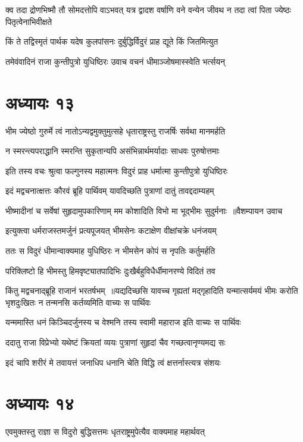 \threelineshloka
{क्व तदा द्रोणभिष्मौ तौ सोमदत्तोपि वाऽभवत्}
{यत्र द्वादश वर्षाणि वने वन्येन जीवथ}
{न तदा त्वां पिता ज्येष्ठः पितृत्वेनाभिवीक्षते}


\twolineshloka
{किं ते तद्विस्मृतं पार्थक यदेष कुलपांसनः}
{दुर्बुद्धिर्विदुरं प्राह द्यूते किं जितमित्युत}


\twolineshloka
{तमेवंवादिनं राजा कुन्तीपुत्रो युधिष्ठिरः}
{उवाच वचनं धीमाञ्जोषमास्स्वेति भर्त्सयन्}


\chapter{अध्यायः १३}
\twolineshloka
{भीम ज्येष्ठो गुरुर्मे त्वं नातोऽन्यद्वमुक्तुमुत्सहे}
{धृताराष्ट्रस्तु राजर्षिः सर्वथा मानमर्हति}


\twolineshloka
{न स्मरन्त्यपराद्धानि स्मरन्ति सुकृतान्यपि}
{असंभिन्नार्थमर्यादाः साधवः पुरुषोत्तमाः}


\twolineshloka
{इति तस्य वचः श्रुत्वा फल्गुनस्य महात्मनः}
{विदुरं प्राह धर्मात्मा कुन्तीपुत्रो युधिष्ठिरः}


\twolineshloka
{इदं मद्वचनात्क्षत्तः कौरवं ब्रूहि पार्थिवम्}
{यावदिच्छति पुत्राणां दातुं तावद्ददाम्यहम्}


\threelineshloka
{भीष्मादीनां च सर्वेषां सुहृदामुपकारिणाम्}
{मम कोशादिति विभो मा भूद्भीमः सुदुर्मनाः ॥वैशम्पायन उवाच}
{}


\twolineshloka
{इत्युक्त्वा धर्मराजस्तमर्जुनं प्रत्यपूजयत्}
{भीमसेनः कटाक्षेण वीक्षांचक्रे धनंजयम्}


\twolineshloka
{ततः स विदुरं धीमान्वाक्यमाह युधिष्ठिरः}
{न भीमसेन कोपं स नृपतिः कर्तुमर्हति}


\twolineshloka
{परिक्लिष्टो हि भीमस्तु हिमवृष्ट्यातपादिभिः}
{दुःखैर्बहुविधैर्धीमानरण्ये विदितं तव}


किंतु मद्वचनाद्ब्रूहि राजानं भरतर्षभम् ॥यद्यदिच्छसि यावच्च गृह्यतां मद्गृहादिति
\twolineshloka
{यन्मात्सर्यमयं भीमः करोति भृशदुःखितः}
{न तन्मनसि कर्तव्यमिति वाच्यः स पार्थिवः}


\twolineshloka
{यन्ममास्ति धनं किञ्चिदर्जुनस्य च वेश्मनि}
{तस्य स्वामी महाराज इति वाच्यः स पार्थिवः}


\twolineshloka
{ददातु राजा विप्रेभ्यो यथेष्टं क्रियतां व्ययः}
{पुत्राणां सुहृदां चैव गच्छत्वानृण्यमद्य सः}


\twolineshloka
{इदं चापि शरीरं मे तवायत्तं जनाधिप}
{धनानि चेति विद्धि त्वं क्षत्तर्नास्त्यत्र संशयः}


\chapter{अध्यायः १४}
\twolineshloka
{एवमुक्तस्तु राज्ञा स विदुरो बुद्धिसत्तमः}
{धृतराष्ट्रमुपेत्यैव वाक्यमाह महार्थवत्}


